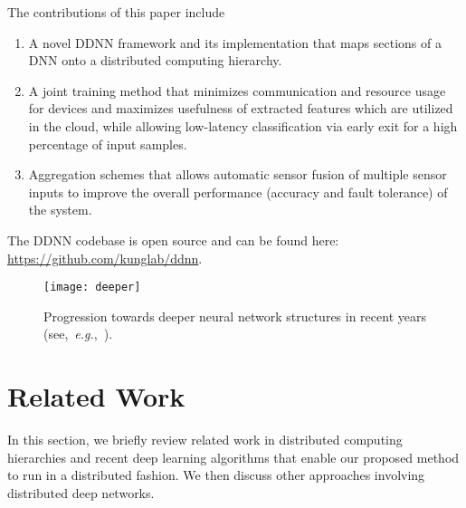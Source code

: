 \documentclass[10pt, conference, compsocconf]{IEEEtran}
\newcommand{\eg}{\emph{e.g.}}
\begin{document}
The contributions of this paper include 
\begin{enumerate}
    \item A novel DDNN framework and its implementation that maps sections of a DNN onto a distributed computing hierarchy.
    \item A joint training method that minimizes communication and resource usage for devices and maximizes usefulness of extracted features which are utilized in the cloud, while allowing low-latency classification via early exit for a high percentage of input samples.
    \item Aggregation schemes that allows automatic sensor fusion of multiple sensor inputs to improve the overall performance (accuracy and fault tolerance) of the system.
\end{enumerate} 

The DDNN codebase is open source and can be found here: \url{https://github.com/kunglab/ddnn}.


\begin{figure}
    \centering
    \texttt{[image: deeper]}
    \caption{Progression towards deeper neural network structures in recent years (see,~\eg,~\cite{lecun1998gradient,krizhevsky2012imagenet,simonyan2014very,szegedy2015going,he2015deep}).}
    \label{fig:deeper}
\end{figure}
 

\section{Related Work}
In this section, we briefly review related work in distributed computing hierarchies and recent deep learning algorithms that enable our proposed method to run in a distributed fashion. We then discuss other approaches involving distributed deep networks.  
\end{document}
